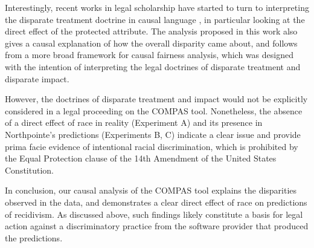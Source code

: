 \documentclass{article}
\begin{document}
Interestingly, recent works in legal scholarship have started to turn to
interpreting the disparate treatment doctrine in causal language
\cite{plecko2022causal}, in particular looking at the direct effect of
the protected attribute. The analysis proposed in this work also gives a
causal explanation of how the overall disparity came about, and follows
from a more broad framework for causal fairness analysis, which was
designed with the intention of interpreting the legal doctrines of
disparate treatment and disparate impact.

However, the doctrines of disparate treatment and impact would not be
explicitly considered in a legal proceeding on the COMPAS tool.
Nonetheless, the absence of a direct effect of race in reality
(Experiment A) and its presence in Northpointe's predictions
(Experiments B, C) indicate a clear issue and provide prima facie
evidence of intentional racial discrimination, which is prohibited by
the Equal Protection clause of the 14th Amendment of the United States
Constitution.

In conclusion, our causal analysis of the COMPAS tool explains the
disparities observed in the data, and demonstrates a clear direct effect
of race on predictions of recidivism. As discussed above, such findings
likely constitute a basis for legal action against a discriminatory
practice from the software provider that produced the predictions.



\end{document}
